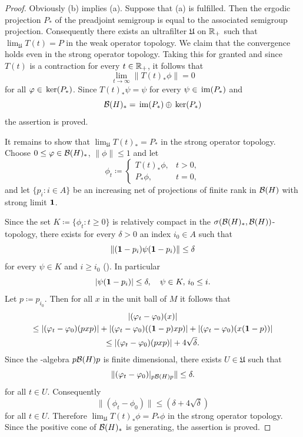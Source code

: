 \begin{proof}
Obviously (b) implies (a).
Suppose that (a) is fulfilled.
Then the ergodic projection $ P_{*} $  of the preadjoint semigroup is equal to the associated semigroup projection.
Consequently there exists an ultrafilter $ \mathfrak{U} $  on $ \mathbb{R}_{+} $  such that $ \lim_{\mathfrak{U}} T(t) = P $  in the weak operator topology.
We claim that the convergence holds even in the strong operator topology.
Taking this for granted and since $ T(t) $ is a contraction for every $ t \in \mathbb{R}_{+} $, it follows that
\[
\lim_{t \to \infty} \|T(t)_{*}\phi\| = 0
\]
for all $ \phi \in \Kern{P_{*}} $.
Since $ T(t)_{*}\psi = \psi $  for every 
$ \psi \in \mathop{}\mathrm{im}(P_{*}) $  and
\[
\mathcal{B}(H)_{*} = \mathop{}\mathrm{im}(P_{*}) \oplus \mathop{}\mathrm{ker}(P_{*})
\]
the assertion is proved.

It remains to show that $ \lim_{\mathfrak{U}} T(t)_{*} = P_{*} $  in the strong operator topology.
Choose $ 0 \leq \phi \in \BH_{*} $, $ \|\phi\| \leq 1 $  and let 
%
\[
	\phi_{t} \coloneqq 
	\begin{cases}
	T(t)_{*}\phi ,	&   t > 0 , \\
	P_{*}\phi	,	&   t = 0, 
	\end{cases} 
\]
%
and let $ \{p_{i}: i \in A\} $  be an increasing net of projections of finite rank in $ \mathcal{B}(H) $  with strong limit $\mathbf{1}$.

Since the set $ K \coloneqq \{\phi_{t}: t \geq 0\} $  is relatively compact in the $ \sigma(\mathcal{B}(H)_{*},\mathcal{B}(H)) $-topology, there exists for every $ \delta > 0 $  an index $ i_{0} \in A $  such that
\[
\|(\1 - p_{i})\psi(\1 - p_{i})\| \leq \delta
\]
for every $ \psi \in K $  and $ i \geq i_{0} $  (\textcite[Theorem III.5.4.(vi)]{takesaki:1979}).
In particular
\[
|\psi(\1 - p_{i})| \leq \delta, \quad \psi \in K,\, i_{0} \leq i.
\]
Let $ p \coloneqq p_{i_{0}} $.
Then for all $ x $  in the unit ball of\/ $ M $  it follows that
\begin{gather*}
|(\phi_{t} - \phi_{0})(x)|  \\
\leq |(\phi_{t} - \phi_{0})(pxp)| 
     + |(\phi_{t} - \phi_{0})((\1-p)xp)| 
+ |(\phi_{t} - \phi_{0})(x(\1-p))| \\
     \leq 
 |(\phi_{t} - \phi_{0})(pxp)| + 4\sqrt{\delta} .
\end{gather*}
Since the \WA-algebra $ p \mathcal{B}(H) p $  is finite dimensional, there exists $ U \in \mathfrak{U} $  such that
\[
	\|(\phi_{t} - \phi_{0})\vert_{p \BH p} \| \leq \delta .
\]
for all $ t \in U $.
Consequently
\[
\|(\phi_{t} - \phi_{0})\| \leq (\delta + 4\sqrt{\delta})
\]
for all $ t \in U $.
Therefore $ \lim_{\mathfrak{U}} T(t)_{*}\phi = P_{*}\phi $  in the strong operator topology.
Since the positive cone of\/ $ \mathcal{B}(H)_{*} $  is generating, the assertion is proved.
\end{proof}
